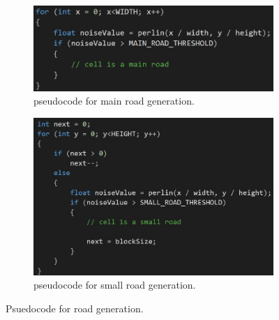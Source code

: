 	\begin{figure}[h]
		\begin{subfigure}{0.5\textwidth}
			\centering
			\includegraphics[width=0.9\linewidth]{"Images/main roads code"}
			\caption{pseudocode for main road generation.}
			\label{fig:main-roads-code}
		\end{subfigure}
		\begin{subfigure}{0.5\textwidth}
			\centering
			\includegraphics[width=0.9\linewidth]{"Images/small roads code"}
			\caption{pseudocode for small road generation.}
			\label{fig:small-roads-code}
		\end{subfigure}
				\caption{Psuedocode for road generation.}
				\label{fig:pseudo-code-roads}
	\end{figure}
		
